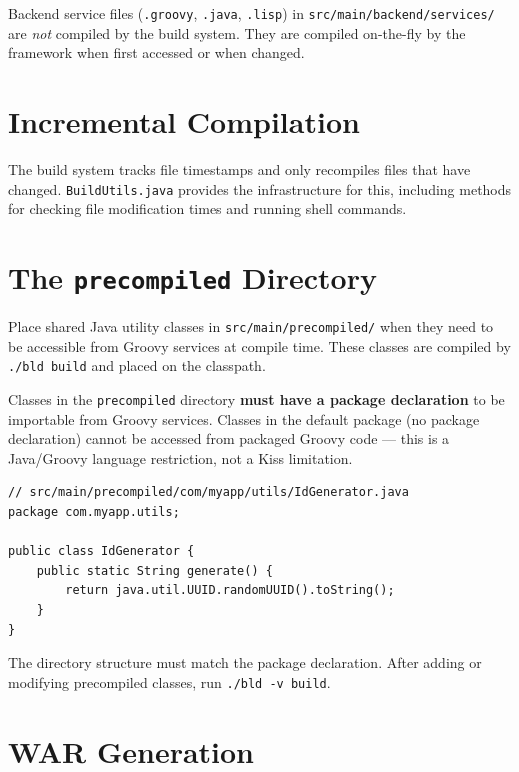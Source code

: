 \begin{notebox}
Backend service files (\texttt{.groovy}, \texttt{.java}, \texttt{.lisp}) in \texttt{src/main/backend/services/} are \emph{not} compiled by the build system.  They are compiled on-the-fly by the framework when first accessed or when changed.
\end{notebox}

\section{Incremental Compilation}
\label{sec:build-incremental}

The build system tracks file timestamps and only recompiles files that have changed.  \texttt{BuildUtils.java} provides the infrastructure for this, including methods for checking file modification times and running shell commands.

\section{The \texttt{precompiled} Directory}
\label{sec:build-precompiled}

Place shared Java utility classes in \texttt{src/main/precompiled/} when they need to be accessible from Groovy services at compile time.  These classes are compiled by \texttt{./bld build} and placed on the classpath.

\begin{warnbox}
Classes in the \texttt{precompiled} directory \textbf{must have a package declaration} to be importable from Groovy services.  Classes in the default package (no package declaration) cannot be accessed from packaged Groovy code --- this is a Java/Groovy language restriction, not a Kiss limitation.
\end{warnbox}

\begin{lstlisting}[style=java]
// src/main/precompiled/com/myapp/utils/IdGenerator.java
package com.myapp.utils;

public class IdGenerator {
    public static String generate() {
        return java.util.UUID.randomUUID().toString();
    }
}
\end{lstlisting}

\noindent
The directory structure must match the package declaration.  After adding or modifying precompiled classes, run \texttt{./bld -v build}.

\section{WAR Generation}
\label{sec:build-war}

